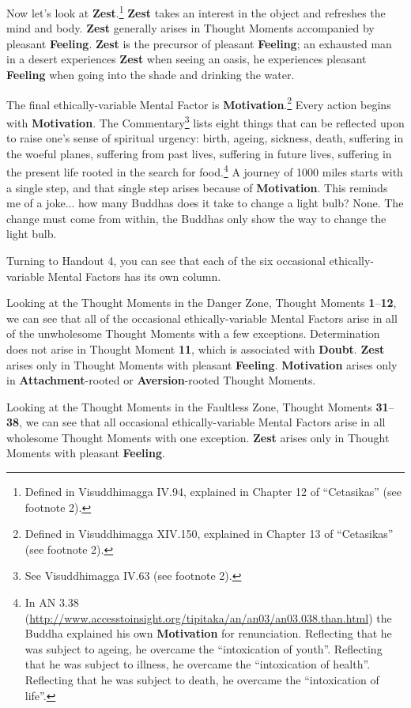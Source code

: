 Now let’s look at \textbf{Zest}.\footnote{Defined in Visuddhimagga IV.94, explained in Chapter 12 of “Cetasikas” (see footnote 2).} \textbf{Zest} takes an interest in the object and refreshes the mind and body. \textbf{Zest} generally arises in Thought Moments accompanied by pleasant \textbf{Feeling}. \textbf{Zest} is the precursor of pleasant \textbf{Feeling}; an exhausted man in a desert experiences \textbf{Zest} when seeing an oasis, he experiences pleasant \textbf{Feeling} when going into the shade and drinking the water.

The final ethically-variable Mental Factor is \textbf{Motivation}.\footnote{Defined in Visuddhimagga XIV.150, explained in Chapter 13 of “Cetasikas” (see footnote 2).} Every action begins with \textbf{Motivation}. The Commentary\footnote{See Visuddhimagga IV.63 (see footnote 2).} lists eight things that can be reflected upon to raise one’s sense of spiritual urgency: birth, ageing, sickness, death, suffering in the woeful planes, suffering from past lives, suffering in future lives, suffering in the present life rooted in the search for food.\footnote{In AN 3.38 (\url{http://www.accesstoinsight.org/tipitaka/an/an03/an03.038.than.html}) the Buddha explained his own \textbf{Motivation} for renunciation. Reflecting that he was subject to ageing, he overcame the “intoxication of youth”. Reflecting that he was subject to illness, he overcame the “intoxication of health”. Reflecting that he was subject to death, he overcame the “intoxication of life”.} A journey of 1000 miles starts with a single step, and that single step arises because of \textbf{Motivation}. This reminds me of a joke... how many Buddhas does it take to change a light bulb? None. The change must come from within, the Buddhas only show the way to change the light bulb.

Turning to Handout 4, you can see that each of the six occasional ethically-variable Mental Factors has its own column.

Looking at the Thought Moments in the Danger Zone, Thought Moments \textbf{1}--\textbf{12}, we can see that all of the occasional ethically-variable Mental Factors arise in all of the unwholesome Thought Moments with a few exceptions. Determination does not arise in Thought Moment \textbf{11}, which is associated with \textbf{Doubt}. \textbf{Zest} arises only in Thought Moments with pleasant \textbf{Feeling}. \textbf{Motivation} arises only in \textbf{Attachment}-rooted or \textbf{Aversion}-rooted Thought Moments.

Looking at the Thought Moments in the Faultless Zone, Thought Moments \textbf{31}--\textbf{38}, we can see that all occasional ethically-variable Mental Factors arise in all wholesome Thought Moments with one exception. \textbf{Zest} arises only in Thought Moments with pleasant \textbf{Feeling}.

